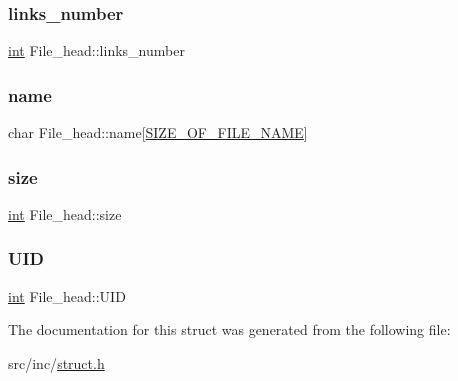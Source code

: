\subsubsection{\texorpdfstring{links\_number}{links\_number}}
{\footnotesize\ttfamily \mbox{\hyperlink{structint}{int}} File\+\_\+head\+::links\+\_\+number}

\mbox{\label{struct_file__head_aa682255565f19d65b22b3c1ba32aafd8}} 
\subsubsection{\texorpdfstring{name}{name}}
{\footnotesize\ttfamily char File\+\_\+head\+::name\mbox{[}\mbox{\hyperlink{constants_8h_a9a18fea8baac399d2416cde730c33888}{S\+I\+Z\+E\+\_\+\+O\+F\+\_\+\+F\+I\+L\+E\+\_\+\+N\+A\+ME}}\mbox{]}}

\mbox{\label{struct_file__head_a53e6325bcfd6a435902e0a4b09e2459f}} 
\subsubsection{\texorpdfstring{size}{size}}
{\footnotesize\ttfamily \mbox{\hyperlink{structint}{int}} File\+\_\+head\+::size}

\mbox{\label{struct_file__head_a4a547fa014a07489ddd5b22cff5e48ab}} 
\subsubsection{\texorpdfstring{UID}{UID}}
{\footnotesize\ttfamily \mbox{\hyperlink{structint}{int}} File\+\_\+head\+::\+U\+ID}



The documentation for this struct was generated from the following file\+:\begin{DoxyCompactItemize}
\item 
src/inc/\mbox{\hyperlink{struct_8h}{struct.\+h}}\end{DoxyCompactItemize}

